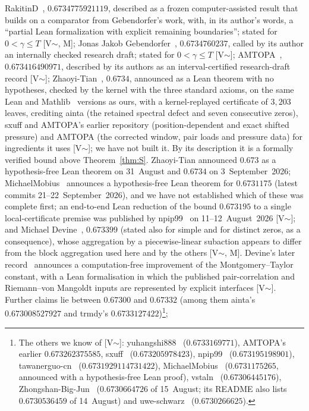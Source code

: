 \mbox{RakitinD}~\cite{Rakitin}, $0.6734775921119$, described as a frozen computer-assisted result that builds on a comparator from
Gebendorfer's work, with, in its author's words, a ``partial Lean formalization with explicit remaining boundaries''; stated for
$0<\gamma\le T$ [V$\sim$, M];
Jonas Jakob Gebendorfer~\cite{Gebendorfer}, $0.6734760237$, called by its author an internally checked research draft; stated for
$0<\gamma\le T$ [V$\sim$];
\mbox{AMTOPA}~\cite{AMTOPA}, $0.673416490971$, described by its authors as an interval-certified research-draft record [V$\sim$];
Zhaoyi-Tian~\cite{ZhaoyiTian}, $0.6734$, announced as a Lean theorem with no hypotheses, checked by the kernel with the three standard axioms,
on the same Lean and Mathlib~\cite{Mathlib} versions as ours, with a kernel-replayed certificate of $3{,}203$ leaves, crediting \mbox{ainta} (the retained spectral defect and seven
consecutive zeros), \mbox{sxuff} and \mbox{AMTOPA}'s earlier repository (position-dependent and exact shifted pressure) and \mbox{AMTOPA} (the corrected window,
pair loads and pressure data) for ingredients it uses [V$\sim$]; we have not built it. By its description it is a formally verified bound
above Theorem~\ref{thm:S}. Zhaoyi-Tian announced $0.673$ as a hypothesis-free Lean theorem on 31~August and $0.6734$ on 3~September~2026;
\mbox{MichaelMobius}~\cite{Hurtado} announces a hypothesis-free Lean theorem for $0.6731175$ (latest commits 21--22~September~2026), and we have not
established which of these was complete first; an end-to-end Lean reduction of the bound $0.673195$ to a single local-certificate premise
was published by \mbox{npip99}~\cite{npip99} on 11--12~August~2026 [V$\sim$];
and Michael Devine~\cite{Devine22066689}, $0.673399$ (stated also for simple and for distinct zeros, as a consequence), whose aggregation by
a piecewise-linear subaction appears to differ from the block aggregation used here and by the others [V$\sim$, M]. Devine's later
record~\cite{Devine22287432} announces a computation-free improvement of the Montgomery--Taylor constant, with a Lean formalisation in which
the published pair-correlation and Riemann--von Mangoldt inputs are represented by explicit interfaces [V$\sim$].
Further claims lie between $0.67300$ and $0.67332$ (among them \mbox{ainta}'s $0.673008527927$ and \mbox{trmdy}'s
$0.6733127422$)\footnote{The others we know of [V$\sim$]: \mbox{yuhangshi888}~\cite{yuhangshi} ($0.6733169771$), \mbox{AMTOPA}'s earlier $0.673262375585$,
\mbox{sxuff}~\cite{sxuff} ($0.673205978423$), \mbox{npip99}~\cite{npip99} ($0.673195198901$), tawanerguo-cn~\cite{TawanRepo} ($0.6731929114731422$),
\mbox{MichaelMobius}~\cite{Hurtado} ($0.6731175265$, announced with a hypothesis-free Lean proof), \mbox{vstaln}~\cite{vstaln} ($0.67306445176$),
Zhongshan-Big-Jun~\cite{Zhongshan} ($0.6730664726$ of 15~August; its README also lists $0.6730536459$ of 14~August) and uwe-schwarz~\cite{uweschwarz} ($0.6730266625$).};
